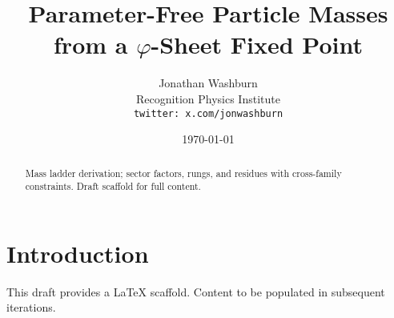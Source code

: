 \documentclass[11pt,letterpaper]{article}
\title{Parameter-Free Particle Masses from a $\varphi$-Sheet Fixed Point}
\author{Jonathan Washburn\\Recognition Physics Institute\\\texttt{twitter: x.com/jonwashburn}}
\date{\today}
\begin{document}
\maketitle
\begin{abstract}
Mass ladder derivation; sector factors, rungs, and residues with cross-family constraints. Draft scaffold for full content.
\end{abstract}
\section{Introduction}
This draft provides a LaTeX scaffold. Content to be populated in subsequent iterations.
\end{document}
